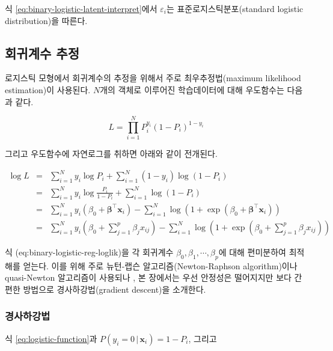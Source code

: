 \documentclass[]{book}
\begin{document}
식 \eqref{eq:binary-logistic-latent-interpret}에서 \(\varepsilon_i\)는 표준로지스틱분포(standard logistic distribution)을 따른다.

\hypertarget{binary-logistic-reg-estimation}{%
\subsection{회귀계수 추정}\label{binary-logistic-reg-estimation}}

로지스틱 모형에서 회귀계수의 추정을 위해서 주로 최우추정법(maximum likelihood estimation)이 사용된다. \(N\)개의 객체로 이루어진 학습데이터에 대해 우도함수는 다음과 같다.

\begin{equation*}
L = \prod_{i = 1}^{N} P_i^{y_i} (1 - P_i)^{1 - y_i}
\end{equation*}

그리고 우도함수에 자연로그를 취하면 아래와 같이 전개된다.

\begin{eqnarray}
\log L &=& \sum_{i = 1}^{N} y_i \log P_i + \sum_{i = 1}^{N} (1 - y_i) \log (1 - P_i)\\
&=& \sum_{i = 1}^{N} y_i \log \frac{P_i}{1 - P_i} + \sum_{i = 1}^{N} \log (1 - P_i)\\
&=& \sum_{i = 1}^{N} y_i (\beta_0 + \boldsymbol\beta^\top \mathbf{x}_i) - \sum_{i = 1}^{N}  \log (1 + \exp (\beta_0 + \boldsymbol\beta^\top \mathbf{x}_i) )\\
&=& \sum_{i = 1}^{N} y_i \left(\beta_0 + \sum_{j = 1}^{p} \beta_j x_{ij} \right) - \sum_{i = 1}^{N}  \log \left(1 + \exp\left(\beta_0 + \sum_{j = 1}^{p} \beta_j x_{ij}\right)\right)
\label{eq:binary-logistic-reg-loglik}
\end{eqnarray}

식 (eq:binary-logistic-reg-loglik)을 각 회귀계수 \(\beta_0, \beta_1, \cdots, \beta_p\)에 대해 편미분하여 최적해를 얻는다. 이를 위해 주로 뉴턴-랩슨 알고리즘(Newton-Raphson algorithm)이나 quasi-Newton 알고리즘이 사용되나 \citep{jun2012datamining}, 본 장에서는 우선 안정성은 떨어지지만 보다 간편한 방법으로 경사하강법(gradient descent)을 소개한다.

\hypertarget{binary-logistic-gradient-descent}{%
\subsubsection{경사하강법}\label{binary-logistic-gradient-descent}}

식 \eqref{eq:logistic-function}과 \(P(y_i = 0 \,|\, \mathbf{x}_i) = 1 - P_i\), 그리고
\end{document}
